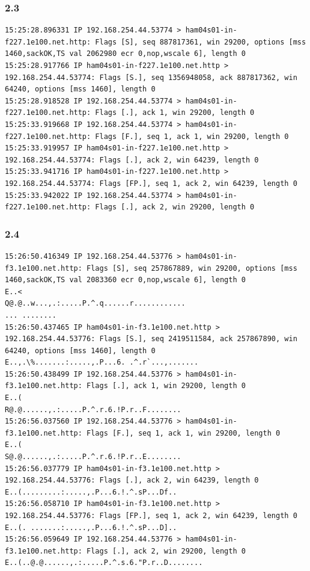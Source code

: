 \documentclass[12pt]{article}
\theoremstyle{plain}
\begin{document}
\subsubsection{2.3}
\begin{lstlisting}
15:25:28.896331 IP 192.168.254.44.53774 > ham04s01-in-f227.1e100.net.http: Flags [S], seq 887817361, win 29200, options [mss 1460,sackOK,TS val 2062980 ecr 0,nop,wscale 6], length 0
15:25:28.917766 IP ham04s01-in-f227.1e100.net.http > 192.168.254.44.53774: Flags [S.], seq 1356948058, ack 887817362, win 64240, options [mss 1460], length 0
15:25:28.918528 IP 192.168.254.44.53774 > ham04s01-in-f227.1e100.net.http: Flags [.], ack 1, win 29200, length 0
15:25:33.919668 IP 192.168.254.44.53774 > ham04s01-in-f227.1e100.net.http: Flags [F.], seq 1, ack 1, win 29200, length 0
15:25:33.919957 IP ham04s01-in-f227.1e100.net.http > 192.168.254.44.53774: Flags [.], ack 2, win 64239, length 0
15:25:33.941716 IP ham04s01-in-f227.1e100.net.http > 192.168.254.44.53774: Flags [FP.], seq 1, ack 2, win 64239, length 0
15:25:33.942022 IP 192.168.254.44.53774 > ham04s01-in-f227.1e100.net.http: Flags [.], ack 2, win 29200, length 0
\end{lstlisting}
\subsubsection{2.4}
\begin{lstlisting}
15:26:50.416349 IP 192.168.254.44.53776 > ham04s01-in-f3.1e100.net.http: Flags [S], seq 257867889, win 29200, options [mss 1460,sackOK,TS val 2083360 ecr 0,nop,wscale 6], length 0
E..<
Q@.@..w...,.:.....P.^.q......r............
... ........
15:26:50.437465 IP ham04s01-in-f3.1e100.net.http > 192.168.254.44.53776: Flags [S.], seq 2419511584, ack 257867890, win 64240, options [mss 1460], length 0
E..,.\%.......:.....,.P...6. .^.r`...,.......
15:26:50.438499 IP 192.168.254.44.53776 > ham04s01-in-f3.1e100.net.http: Flags [.], ack 1, win 29200, length 0
E..(
R@.@......,.:.....P.^.r.6.!P.r..F........
15:26:56.037560 IP 192.168.254.44.53776 > ham04s01-in-f3.1e100.net.http: Flags [F.], seq 1, ack 1, win 29200, length 0
E..(
S@.@......,.:.....P.^.r.6.!P.r..E........
15:26:56.037779 IP ham04s01-in-f3.1e100.net.http > 192.168.254.44.53776: Flags [.], ack 2, win 64239, length 0
E..(.........:.....,.P...6.!.^.sP...Df..
15:26:56.058710 IP ham04s01-in-f3.1e100.net.http > 192.168.254.44.53776: Flags [FP.], seq 1, ack 2, win 64239, length 0
E..(. .......:.....,.P...6.!.^.sP...D]..
15:26:56.059649 IP 192.168.254.44.53776 > ham04s01-in-f3.1e100.net.http: Flags [.], ack 2, win 29200, length 0
E..(..@.@......,.:.....P.^.s.6."P.r..D........
\end{lstlisting}
\end{document}
